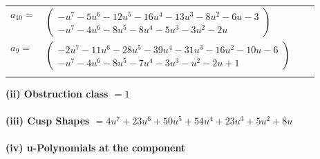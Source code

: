 \documentclass[1p]{elsarticle_modified}
\theoremstyle{definition}
\begin{document}
\begin{tabular}{m{7pt} m{180pt} m{7pt} m{180pt} }
\flushright $a_{10}=$&$\begin{pmatrix}- u^7-5 u^6-12 u^5-16 u^4-13 u^3-8 u^2-6 u-3\\- u^7-4 u^6-8 u^5-8 u^4-5 u^3-3 u^2-2 u\end{pmatrix}$ \\
\flushright $a_{9}=$&$\begin{pmatrix}-2 u^7-11 u^6-28 u^5-39 u^4-31 u^3-16 u^2-10 u-6\\- u^7-4 u^6-8 u^5-7 u^4-3 u^3- u^2-2 u+1\end{pmatrix}$\\&\end{tabular}
\flushleft \textbf{(ii) Obstruction class $= 1$}\\~\\
\flushleft \textbf{(iii) Cusp Shapes $= 4 u^7+23 u^6+50 u^5+54 u^4+23 u^3+5 u^2+8 u$}\\~\\
\newpage\renewcommand{\arraystretch}{1}
\flushleft \textbf{(iv) u-Polynomials at the component}\newline \\
\end{document}
